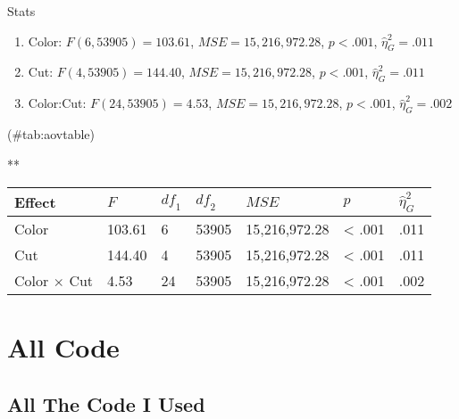 \documentclass[10pt,ignorenonframetext,,aspectratio=149]{beamer}
\providecommand{\tightlist}{%
  \setlength{\itemsep}{0pt}\setlength{\parskip}{0pt}}
\begin{document}
\begin{frame}{Stats}
\protect\hypertarget{stats}{}
\begin{enumerate}
\tightlist
\item
  Color: \(F(6, 53905) = 103.61\), \(\mathit{MSE} = 15,216,972.28\),
  \(p < .001\), \(\hat{\eta}^2_G = .011\)
\item
  Cut: \(F(4, 53905) = 144.40\), \(\mathit{MSE} = 15,216,972.28\),
  \(p < .001\), \(\hat{\eta}^2_G = .011\)
\item
  Color:Cut: \(F(24, 53905) = 4.53\), \(\mathit{MSE} = 15,216,972.28\),
  \(p < .001\), \(\hat{\eta}^2_G = .002\)
\end{enumerate}

(\#tab:aovtable)

**

\begin{longtable}[]{@{}lllllll@{}}
\toprule
Effect & \(F\) & \(\mathit{df}_1\) & \(\mathit{df}_2\) &
\(\mathit{MSE}\) & \(p\) & \(\hat{\eta}^2_G\)\tabularnewline
\midrule
\endhead
Color & 103.61 & 6 & 53905 & 15,216,972.28 & \textless{} .001 &
.011\tabularnewline
Cut & 144.40 & 4 & 53905 & 15,216,972.28 & \textless{} .001 &
.011\tabularnewline
Color \(\times\) Cut & 4.53 & 24 & 53905 & 15,216,972.28 & \textless{}
.001 & .002\tabularnewline
\bottomrule
\end{longtable}
\end{frame}

\hypertarget{all-code}{%
\section*{All Code}\label{all-code}}

\hypertarget{all-the-code-i-used}{%
\subsection*{All The Code I Used}\label{all-the-code-i-used}}
\end{document}
